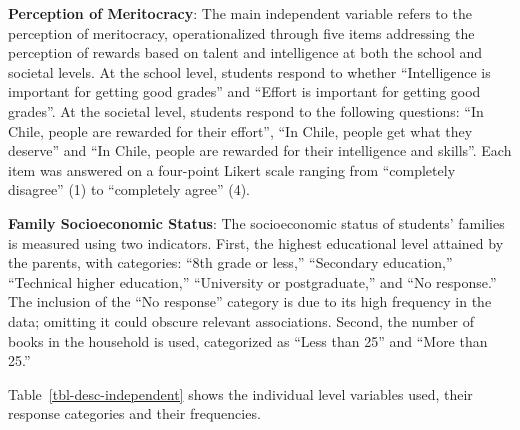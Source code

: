 \documentclass[
    behavsci,
    article,
    submit,
moreauthors
]{mdpi}
\begin{document}
\textbf{Perception of Meritocracy}: The main independent variable refers
to the perception of meritocracy, operationalized through five items
addressing the perception of rewards based on talent and intelligence at
both the school and societal levels. At the school level, students
respond to whether ``Intelligence is important for getting good grades''
and ``Effort is important for getting good grades''. At the societal
level, students respond to the following questions: ``In Chile, people
are rewarded for their effort'', ``In Chile, people get what they
deserve'' and ``In Chile, people are rewarded for their intelligence and
skills''. Each item was answered on a four-point Likert scale ranging
from ``completely disagree'' (1) to ``completely agree'' (4).

\textbf{Family Socioeconomic Status}: The socioeconomic status of
students' families is measured using two indicators. First, the highest
educational level attained by the parents, with categories: ``8th grade
or less,'' ``Secondary education,'' ``Technical higher education,''
``University or postgraduate,'' and ``No response.'' The inclusion of
the ``No response'' category is due to its high frequency in the data;
omitting it could obscure relevant associations. Second, the number of
books in the household is used, categorized as ``Less than 25'' and
``More than 25.''

Table~\ref{tbl-desc-independent} shows the individual level variables
used, their response categories and their frequencies.
\end{document}
